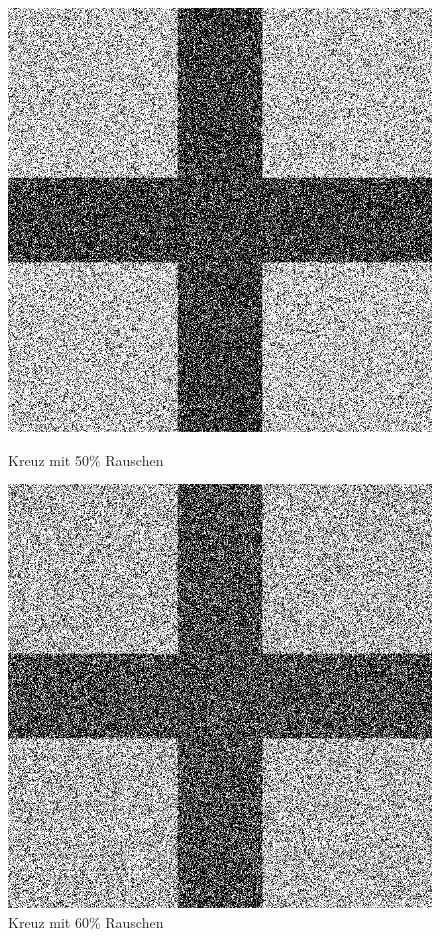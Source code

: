 \begin{figure}[hbt]
	\begin{minipage}{0.49 \textwidth}
		\includegraphics[width=\textwidth]{./Bilder/Auswertung/BeispielBilder/Picture_Crossing_noise_50_pixelCnt_128_featureCnt_5}
		\caption{Kreuz mit 50\% Rauschen}
	\end{minipage}
	\hfill
	\begin{minipage}{0.49 \textwidth}
		\includegraphics[width=\textwidth]{./Bilder/Auswertung/BeispielBilder/Picture_Crossing_noise_60_pixelCnt_128_featureCnt_5}
		\caption{Kreuz mit 60\% Rauschen}
	\end{minipage}
\end{figure}

